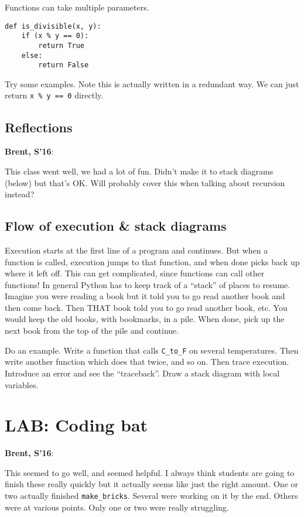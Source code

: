 \documentclass{article}
\newenvironment{reflect}[1]
{
  \begin{lrbox}{\reflectbox}
    \begin{minipage}[t]{\textwidth}
      \textbf{#1}:
}{
    \end{minipage}
  \end{lrbox}
  \fbox{\usebox{\reflectbox}}
}
\begin{document}
Functions can take multiple parameters.

\begin{verbatim}
def is_divisible(x, y):
    if (x % y == 0):
        return True
    else:
        return False
\end{verbatim}

Try some examples.  Note this is actually written in a redundant way.  We
can just return \verb|x % y == 0| directly.

\subsection*{Reflections}

\begin{reflect}{Brent, S'16}
  This class went well, we had a lot of fun.  Didn't make it to stack
  diagrams (below) but that's OK.  Will probably cover this when
  talking about recursion instead?
\end{reflect}

\subsection*{Flow of execution \& stack diagrams}

Execution starts at the first line of a program and continues.  But
when a function is called, execution jumps to that function, and when
done picks back up where it left off.  This can get complicated, since
functions can call other functions!  In general Python has to keep
track of a ``stack'' of places to resume.  Imagine you were reading a
book but it told you to go read another book and then come back.  Then
THAT book told you to go read another book, etc.  You would keep the
old books, with bookmarks, in a pile.  When done, pick up the next
book from the top of the pile and continue.

Do an example. Write a function that calls \verb|C_to_F| on several
temperatures.  Then write another function which does that twice, and
so on.  Then trace execution.  Introduce an error and see the
``traceback''.  Draw a stack diagram with local variables.

\section*{LAB: Coding bat}

\begin{reflect}{Brent, S'16}
  This seemed to go well, and seemed helpful.  I always think students
  are going to finish these really quickly but it actually seems like
  just the right amount.  One or two actually finished
  \verb|make_bricks|.  Several were working on it by the end.  Others
  were at various points.  Only one or two were really struggling.
\end{reflect}
\end{document}
